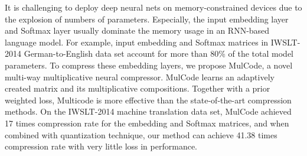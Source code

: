 It is challenging to deploy deep neural nets on memory-constrained devices due to the explosion of numbers of parameters. Especially, the input embedding layer and Softmax layer usually dominate the memory usage in an RNN-based language model. For example, input embedding and Softmax matrices in IWSLT-2014 German-to-English data set account for more than 80\% of the total model parameters. To compress these embedding layers, we propose MulCode, a novel multi-way multiplicative neural compressor. MulCode learns an adaptively created matrix and its multiplicative compositions. Together with a prior weighted loss, Multicode is more effective than the state-of-the-art compression methods. On the IWSLT-2014 machine translation data set, MulCode achieved 17 times compression rate for the embedding and Softmax matrices, and when combined with quantization technique, our method can achieve 41.38 times compression rate with very little loss in performance.